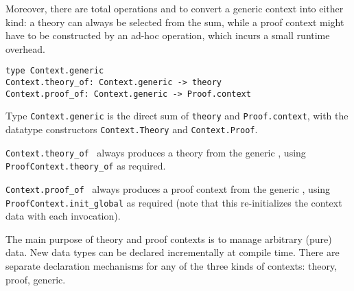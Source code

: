 \begin{isabellebody}
\begin{isamarkuptext}
  Moreover, there are total operations  and  to convert a generic context into either kind: a theory
  can always be selected from the sum, while a proof context might
  have to be constructed by an ad-hoc  operation, which
  incurs a small runtime overhead.%
\end{isamarkuptext}%
\isamarkuptrue%
%
\isadelimmlref
%
\endisadelimmlref
%
\isatagmlref
%
\begin{isamarkuptext}%
\begin{mldecls}
  \verb|type Context.generic| \\
  \verb|Context.theory_of: Context.generic -> theory| \\
  \verb|Context.proof_of: Context.generic -> Proof.context| \\
  \end{mldecls}

  \begin{description}

  \item Type \verb|Context.generic| is the direct sum of \verb|theory| and \verb|Proof.context|, with the datatype
  constructors \verb|Context.Theory| and \verb|Context.Proof|.

  \item \verb|Context.theory_of|~ always produces a
  theory from the generic , using \verb|ProofContext.theory_of| as required.

  \item \verb|Context.proof_of|~ always produces a
  proof context from the generic , using \verb|ProofContext.init_global| as required (note that this re-initializes the
  context data with each invocation).

  \end{description}%
\end{isamarkuptext}%
\isamarkuptrue%
%
\endisatagmlref
{\isafoldmlref}%
%
\isadelimmlref
%
\endisadelimmlref
%
\isamarkuptrue%
%
\begin{isamarkuptext}%
The main purpose of theory and proof contexts is to manage
  arbitrary (pure) data.  New data types can be declared incrementally
  at compile time.  There are separate declaration mechanisms for any
  of the three kinds of contexts: theory, proof, generic.


\end{isamarkuptext}
\end{isabellebody}
